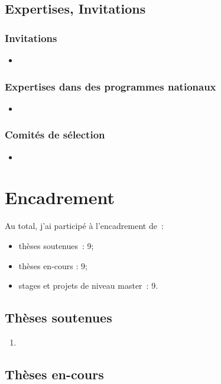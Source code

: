 \documentclass[french]{hdrapplication}
\begin{document}
\subsection{Expertises, Invitations}

\subsubsection{Invitations}
\begin{itemize}
\item 
\end{itemize}

\subsubsection{Expertises dans des programmes nationaux}
\begin{itemize}
\item 
\end{itemize}

\subsubsection{Comités de sélection}
\begin{itemize}
\item 
\end{itemize}

\section{Encadrement}

Au total, j'ai participé à l'encadrement de~:
\begin{itemize}
\item thèses soutenues~: 9;
\item thèses en-cours : 9;
\item stages et projets de niveau master~: 9.
\end{itemize}

\subsection{Thèses soutenues}

\begin{enumerate}
\item 
\end{enumerate}

\subsection{Thèses en-cours}
\end{document}
